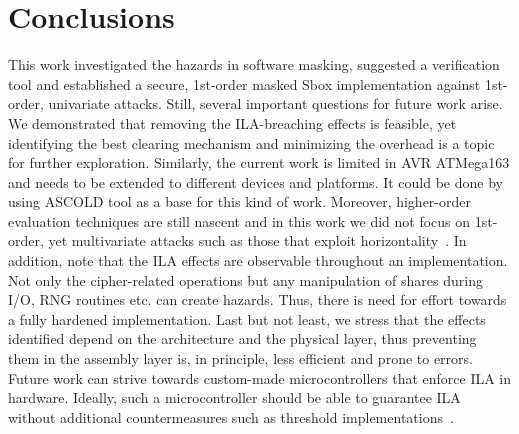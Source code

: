 \section{Conclusions} \label{sec:conclusions}

This work investigated the hazards in software masking, suggested a verification tool and established a secure, 1st-order masked Sbox implementation against 1st-order, univariate attacks. Still, several important questions for future work arise. We demonstrated that removing the ILA-breaching effects is feasible, yet identifying the best clearing mechanism and minimizing the overhead is a topic for further exploration. Similarly, the current work is limited in AVR ATMega163 and needs to be extended to different devices and platforms. It could be done by using ASCOLD tool as a base for this kind of work.  Moreover, higher-order evaluation techniques are still nascent and in this work we did not focus on 1st-order, yet multivariate attacks such as those that exploit horizontality~\cite{DBLP:conf/ches/BattistelloCPZ16}. In addition, note that the ILA effects are observable throughout an implementation. Not only the cipher-related operations but any manipulation of shares during I/O, RNG routines etc. can create hazards. Thus, there is need for effort towards a fully hardened implementation. Last but not least, we stress that the effects identified depend on the architecture and the physical layer, thus preventing them in the assembly layer is, in principle, less efficient and prone to errors. Future work can strive towards custom-made microcontrollers that enforce ILA in hardware. Ideally, such a microcontroller should be able to guarantee ILA without additional countermeasures such as threshold implementations~\cite{DBLP:conf/icics/NikovaRR06}.  